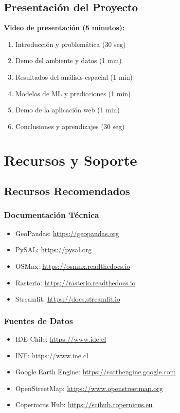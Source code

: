\documentclass[12pt,a4paper]{article}
\begin{document}
\subsection{Presentación del Proyecto}

\begin{tipbox}
\textbf{Video de presentación (5 minutos):}
\begin{enumerate}
    \item Introducción y problemática (30 seg)
    \item Demo del ambiente y datos (1 min)
    \item Resultados del análisis espacial (1 min)
    \item Modelos de ML y predicciones (1 min)
    \item Demo de la aplicación web (1 min)
    \item Conclusiones y aprendizajes (30 seg)
\end{enumerate}
\end{tipbox}

\section{Recursos y Soporte}

\subsection{Recursos Recomendados}

\subsubsection{Documentación Técnica}
\begin{itemize}
    \item GeoPandas: \url{https://geopandas.org}
    \item PySAL: \url{https://pysal.org}
    \item OSMnx: \url{https://osmnx.readthedocs.io}
    \item Rasterio: \url{https://rasterio.readthedocs.io}
    \item Streamlit: \url{https://docs.streamlit.io}
\end{itemize}

\subsubsection{Fuentes de Datos}
\begin{itemize}
    \item IDE Chile: \url{https://www.ide.cl}
    \item INE: \url{https://www.ine.cl}
    \item Google Earth Engine: \url{https://earthengine.google.com}
    \item OpenStreetMap: \url{https://www.openstreetmap.org}
    \item Copernicus Hub: \url{https://scihub.copernicus.eu}
\end{itemize}
\end{document}
